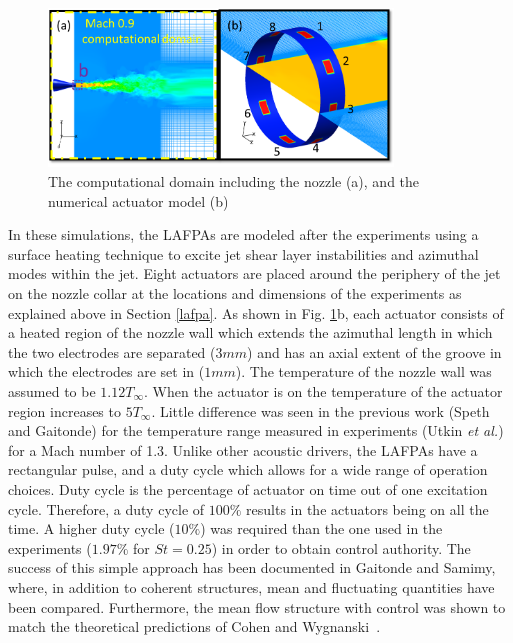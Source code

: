 \documentclass[english]{aiaa-tc}
\begin{document}
\begin{figure}[h]
\begin{center}
\includegraphics[width=3.6in]{actuatormodelnew}
\caption{The computational domain including the nozzle  (a), and the numerical actuator model (b)}\label{fig:actuator}
\end{center}
\end{figure}
In these simulations, the LAFPAs are modeled after the experiments using a surface heating technique to excite jet shear layer instabilities and azimuthal modes within the jet.  Eight actuators are placed around the periphery of the jet on the nozzle collar at the locations and dimensions of the experiments as explained above in Section \ref{lafpa}. As shown in Fig. \ref{fig:actuator}b, each actuator consists of a heated region of the nozzle wall which extends the azimuthal length in which the two electrodes are separated ($3 mm$) and has an axial extent of the groove in which the electrodes are set in ($1 mm$). The temperature of the nozzle wall was assumed to be $1.12T_{\infty}$.  When the actuator is on the temperature of the actuator region increases to $5T_{\infty}$. Little difference was seen in the previous work (Speth and Gaitonde\cite{SpethASM2012}) for the temperature range measured in experiments (Utkin {\em et al.}\cite{uyg2007-2}) for a Mach number of 1.3. Unlike other acoustic drivers, the LAFPAs have a rectangular pulse, and a duty cycle which allows for a wide range of operation choices. Duty cycle is the percentage of actuator on time out of one excitation cycle. Therefore, a duty cycle of $100\%$ results in the actuators being on all the time.  A higher duty cycle ($10\%$) was required than the one used in the experiments ($1.97\%$ for $St=0.25$) in order to obtain control authority.   The success of this 
simple approach has been documented in Gaitonde and Samimy\cite{gdv2011-POF},
where, in addition to coherent structures, mean and fluctuating quantities
have been compared. Furthermore, the mean flow structure with control
was shown to match the theoretical predictions of Cohen and Wygnanski~\cite{cj87-2}.
\end{document}
